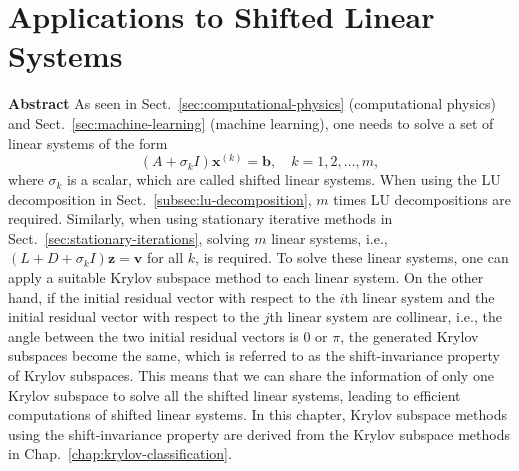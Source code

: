 \clearpage\section{{Applications to Shifted Linear Systems}}\label{chap:shifted-linear-systems}
\setcounter{footnote}{0}
\noindent\textbf{{Abstract}}\quad
{As seen in Sect.\ \ref{sec:computational-physics} (computational physics) and Sect.\ \ref{sec:machine-learning} (machine learning), one needs to solve a set of linear systems of the form}
\[(A+\sigma_k I)\bm x^{(k)}=\bm b,\quad k=1,2,\ldots,m,\]
{where $\sigma_k$ is a scalar, which are called shifted linear systems. When using the LU decomposition in Sect.\ \ref{subsec:lu-decomposition}, $m$ times LU decompositions are required. Similarly, when using stationary iterative methods in Sect.\ \ref{sec:stationary-iterations}, solving $m$ linear systems, i.e., $(L+D+\sigma_k I)\bm z=\bm v$ for all $k$, is required. To solve these linear systems, one can apply a suitable Krylov subspace method to each linear system. On the other hand, if the initial residual vector with respect to the $i$th linear system and the initial residual vector with respect to the $j$th linear system are collinear, i.e., the angle between the two initial residual vectors is $0$ or $\pi$, the generated Krylov subspaces become the same, which is referred to as the shift-invariance property of Krylov subspaces. This means that we can share the information of only one Krylov subspace to solve all the shifted linear systems, leading to efficient computations of shifted linear systems. In this chapter, Krylov subspace methods using the shift-invariance property are derived from the Krylov subspace methods in Chap.\ \ref{chap:krylov-classification}.}
